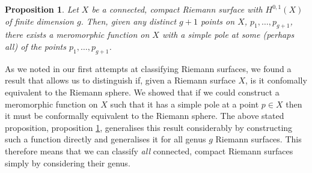\documentclass[11pt]{report}
\newtheorem{prop}[thm]{Proposition}
\theoremstyle{definition}
\begin{document}
\begin{prop}\label{meroFunctionOnGenusGSurface}
  Let $X$ be a connected, compact Riemann surface with $H^{0,1}(X)$ of finite dimension $g$. Then, given any distinct $g+1$ points on $X$, $p_1,\ldots, p_{g+1}$, there exists a meromorphic function on $X$ with a simple pole at some (perhaps all) of the points $p_1,\ldots, p_{g+1}$.
\end{prop} 
As we noted in our first attempts at classifying Riemann surfaces, we found a result that allows us to distinguish if, given a Riemann surface $X$, is it confomally equivalent to the Riemann sphere. We showed that if we could construct a meromorphic function on $X$ such that it has a simple pole at a point $p \in X$ then it must be conformally equivalent to the Riemann sphere. The above stated proposition, proposition \ref{meroFunctionOnGenusGSurface}, generalises this result considerably by constructing such a function directly and generalises it for all genus $g$ Riemann surfaces. This therefore means that we can classify \emph{all} connected, compact Riemann surfaces simply by considering their genus.
\end{document}
